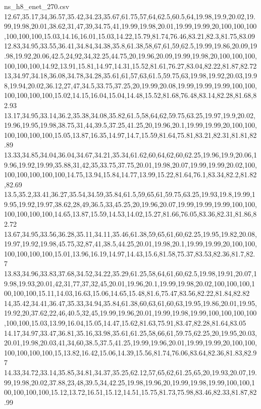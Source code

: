 \begin{filecontents*}[overwrite]{ns_h8_enet_270.csv}
12.67,35.17,34,36.57,35.42,34.23,35.67,61.75,57,64,62.5,60.5,64,19.98,19.9,20.02,19.99,19.98,20.01,38.62,31,47,39,34.75,41,19.99,19.98,20.01,19.99,19.99,20,100,100,100,100,100,100,15.03,14.16,16.01,15.03,14.22,15.79,81.74,76.46,83.21,82.3,81.75,83.09
12.83,34.95,33.55,36.41,34.84,34.38,35.8,61.38,58,67,61,59,62.5,19.99,19.86,20.09,19.98,19.92,20.06,42.5,24,92,34,32.25,44.75,20,19.96,20.09,19.99,19.98,20,100,100,100,100,100,100,14.92,13.91,15.81,14.97,14.31,15.52,81.61,76.27,83.04,82.22,81.87,82.72
13,34.97,34.18,36.08,34.78,34.28,35.61,61,57,63,61.5,59.75,63,19.98,19.92,20.03,19.98,19.94,20.02,36.12,27,47,34.5,33.75,37.25,20,19.99,20.08,19.99,19.99,19.99,100,100,100,100,100,100,15.02,14.15,16.04,15.04,14.48,15.52,81.68,76.48,83.14,82.28,81.68,82.93
13.17,34.95,33.14,36.2,35.38,34.08,35.82,61.5,58,64,62,59.75,63.25,19.97,19.9,20.02,19.96,19.95,19.98,38.75,31,44,39.5,37.25,41.25,20,19.96,20.1,19.99,19.99,20,100,100,100,100,100,100,15.05,13.87,16.35,14.97,14.7,15.59,81.64,75.81,83.21,82.31,81.81,82.89
13.33,34.85,34.04,36.04,34.67,34.21,35.34,61.62,60,64,62,60,62.25,19.96,19.9,20.06,19.96,19.92,19.99,35.88,31,42,35,33.75,37.75,20.01,19.98,20.07,19.99,19.99,20.02,100,100,100,100,100,100,14.75,13.94,15.84,14.77,13.99,15.22,81.64,76.1,83.34,82.2,81.82,82.69
13.5,35.2,33.41,36.27,35.54,34.59,35.84,61.5,59,65,61,59.75,63.25,19.93,19.8,19.99,19.95,19.92,19.97,38.62,28,49,36.5,33,45.25,20,19.96,20.07,19.99,19.99,19.99,100,100,100,100,100,100,14.65,13.87,15.59,14.53,14.02,15.27,81.66,76.05,83.36,82.31,81.86,82.72
13.67,34.95,33.56,36.28,35.11,34.11,35.46,61.38,59,65,61,60,62.25,19.95,19.82,20.08,19.97,19.92,19.98,45.75,32,87,41,38.5,44.25,20.01,19.98,20.1,19.99,19.99,20,100,100,100,100,100,100,15.01,13.96,16.19,14.97,14.43,15.6,81.58,75.37,83.53,82.36,81.7,82.7
13.83,34.96,33.83,37.68,34.52,34.22,35.29,61.25,58,64,61,60,62.5,19.98,19.91,20.07,19.98,19.93,20.01,42,31,77,37,32,45,20.01,19.96,20.1,19.99,19.98,20.02,100,100,100,100,100,100,15.11,14.03,16.63,15.06,14.65,15.48,81.6,75.47,83.56,82.22,81.84,82.82
14,35.42,34.41,36.47,35.33,34.94,35.84,61.38,60,63,61,60,63,19.95,19.86,20.01,19.95,19.92,20,37.62,22,46,40.5,32,45,19.99,19.96,20.01,19.99,19.98,19.99,100,100,100,100,100,100,15.03,13.99,16.04,15.05,14.47,15.62,81.63,75.91,83.47,82.28,81.64,83.05
14.17,34.97,33.47,36.81,35.16,33.98,35.61,61.25,58,66,61,59.75,62.25,20,19.95,20.03,20.01,19.98,20.03,41,34,60,38.5,37.5,41.25,19.99,19.96,20.01,19.99,19.99,20,100,100,100,100,100,100,15,13.82,16.42,15.06,14.39,15.56,81.74,76.06,83.64,82.36,81.83,82.97
14.33,34.72,33.14,35.85,34.81,34.37,35.25,62.12,57,65,62,61.25,65,20,19.93,20.07,19.99,19.98,20.02,37.88,23,48,39.5,34,42.25,19.98,19.96,20,19.99,19.98,19.99,100,100,100,100,100,100,15.12,13.72,16.51,15.12,14.51,15.75,81.73,75.98,83.46,82.33,81.87,82.99

\end{filecontents*}
